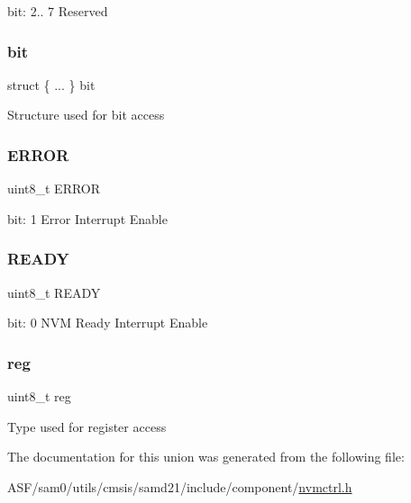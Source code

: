bit\+: 2.. 7 Reserved \mbox{\label{union_n_v_m_c_t_r_l___i_n_t_e_n_s_e_t___type_a580e00f70c948294735e200816e3588f}} 
\subsubsection{\texorpdfstring{bit}{bit}}
{\footnotesize\ttfamily struct \{ ... \}   bit}

Structure used for bit access \mbox{\label{union_n_v_m_c_t_r_l___i_n_t_e_n_s_e_t___type_a4be51829c8720b7d159b77c39924afaa}} 
\subsubsection{\texorpdfstring{ERROR}{ERROR}}
{\footnotesize\ttfamily uint8\+\_\+t E\+R\+R\+OR}

bit\+: 1 Error Interrupt Enable \mbox{\label{union_n_v_m_c_t_r_l___i_n_t_e_n_s_e_t___type_a87c971ad119330af2fdb7bca4011addb}} 
\subsubsection{\texorpdfstring{READY}{READY}}
{\footnotesize\ttfamily uint8\+\_\+t R\+E\+A\+DY}

bit\+: 0 N\+VM Ready Interrupt Enable \mbox{\label{union_n_v_m_c_t_r_l___i_n_t_e_n_s_e_t___type_a9428adc9af4653a2050e2536b55dec8d}} 
\subsubsection{\texorpdfstring{reg}{reg}}
{\footnotesize\ttfamily uint8\+\_\+t reg}

Type used for register access 

The documentation for this union was generated from the following file\+:\begin{DoxyCompactItemize}
\item 
A\+S\+F/sam0/utils/cmsis/samd21/include/component/\mbox{\hyperlink{component_2nvmctrl_8h}{nvmctrl.\+h}}\end{DoxyCompactItemize}

